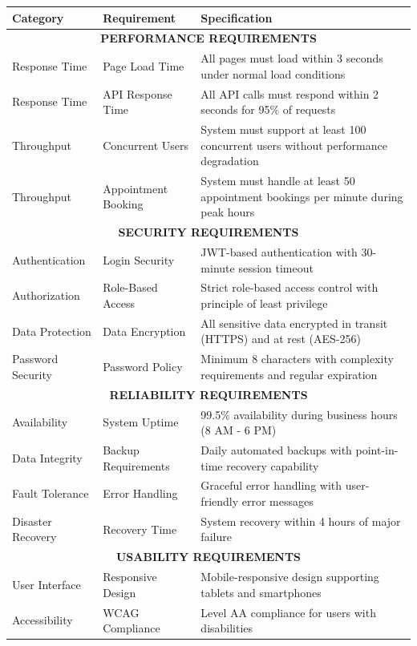 \documentclass[12pt,a4paper]{article}
\begin{document}
\begin{longtable}{|p{2.5cm}|p{4cm}|p{7.5cm}|}
\hline
\textbf{Category} & \textbf{Requirement} & \textbf{Specification} \\
\hline
\multicolumn{3}{|c|}{\textbf{PERFORMANCE REQUIREMENTS}} \\
\hline
Response Time & Page Load Time & All pages must load within 3 seconds under normal load conditions \\
\hline
Response Time & API Response Time & All API calls must respond within 2 seconds for 95\% of requests \\
\hline
Throughput & Concurrent Users & System must support at least 100 concurrent users without performance degradation \\
\hline
Throughput & Appointment Booking & System must handle at least 50 appointment bookings per minute during peak hours \\
\hline
\multicolumn{3}{|c|}{\textbf{SECURITY REQUIREMENTS}} \\
\hline
Authentication & Login Security & JWT-based authentication with 30-minute session timeout \\
\hline
Authorization & Role-Based Access & Strict role-based access control with principle of least privilege \\
\hline
Data Protection & Data Encryption & All sensitive data encrypted in transit (HTTPS) and at rest (AES-256) \\
\hline
Password Security & Password Policy & Minimum 8 characters with complexity requirements and regular expiration \\
\hline
\multicolumn{3}{|c|}{\textbf{RELIABILITY REQUIREMENTS}} \\
\hline
Availability & System Uptime & 99.5\% availability during business hours (8 AM - 6 PM) \\
\hline
Data Integrity & Backup Requirements & Daily automated backups with point-in-time recovery capability \\
\hline
Fault Tolerance & Error Handling & Graceful error handling with user-friendly error messages \\
\hline
Disaster Recovery & Recovery Time & System recovery within 4 hours of major failure \\
\hline
\multicolumn{3}{|c|}{\textbf{USABILITY REQUIREMENTS}} \\
\hline
User Interface & Responsive Design & Mobile-responsive design supporting tablets and smartphones \\
\hline
Accessibility & WCAG Compliance & Level AA compliance for users with disabilities \\

\end{longtable}
\end{document}
